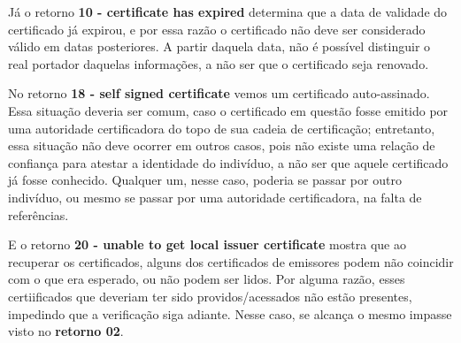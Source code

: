 	Já o retorno \textbf{10 - certificate has expired} determina que a data de validade do certificado já expirou, e por essa razão o certificado não deve ser considerado válido em datas posteriores. A partir daquela data, não é possível distinguir o real portador daquelas informações, a não ser que o certificado seja renovado.

	No retorno \textbf{18 - self signed certificate} vemos um certificado auto-assinado. Essa situação deveria ser comum, caso o certificado em questão fosse emitido por uma autoridade certificadora do topo de sua cadeia de certificação; entretanto, essa situação não deve ocorrer em outros casos, pois não existe uma relação de confiança para atestar a identidade do indivíduo, a não ser que aquele certificado já fosse conhecido. Qualquer um, nesse caso, poderia se passar por outro indivíduo, ou mesmo se passar por uma autoridade certificadora, na falta de referências.

	E o retorno \textbf{20 - unable to get local issuer certificate} mostra que ao recuperar os certificados, alguns dos certificados de emissores podem não coincidir com o que era esperado, ou não podem ser lidos. Por alguma razão, esses certiificados que deveriam ter sido providos/acessados não estão presentes, impedindo que a verificação siga adiante.
	Nesse caso, se alcança o mesmo impasse visto no \textbf{retorno 02}.
